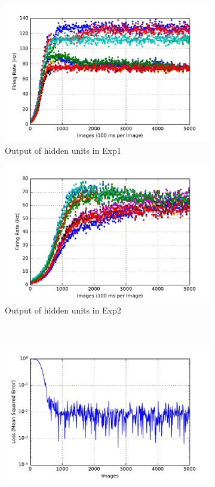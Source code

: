 \begin{figure}
\begin{subfigure}[t]{0.4\textwidth}
		\includegraphics[width=\textwidth]{pics_sdlm/01_exp_SAE_Orig_long/exp1_hid_s.pdf}
		\caption{Output of hidden units in Exp1}
	\end{subfigure}
	\begin{subfigure}[t]{0.4\textwidth}
		\includegraphics[width=\textwidth]{pics_sdlm/01_exp_SAE_Orig_long/exp2_hid_s.pdf}
		\caption{Output of hidden units in Exp2}
	\end{subfigure}\\
	\begin{subfigure}[t]{0.4\textwidth}
		\includegraphics[width=\textwidth]{pics_sdlm/01_exp_SAE_Orig_long/exp1_mse_nons.pdf}

\end{subfigure}
\end{figure}
